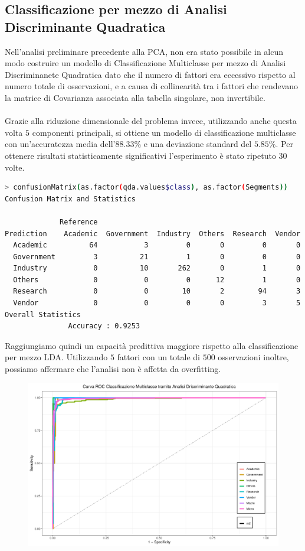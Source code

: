 \documentclass[11pt,a4paper]{article}
\begin{document}
\subsection{Classificazione per mezzo di Analisi Discriminante Quadratica}
Nell'analisi preliminare precedente alla PCA, non era stato possibile in alcun
modo costruire un modello di Classificazione Multiclasse per mezzo di Analisi
Discriminanete Quadratica dato che il numero di fattori era eccessivo rispetto
al numero totale di osservazioni, e a causa di collinearit\`a tra i fattori che
rendevano la matrice di Covarianza associata alla tabella singolare, non
invertibile.\\
\\
Grazie alla riduzione dimensionale del problema invece, utilizzando anche questa
volta $5$ componenti principali, si ottiene un modello di classificazione
multiclasse con un'accuratezza media dell'$88.33\%$ e una deviazione standard
del $5.85\%$. Per ottenere risultati statisticamente significativi l'esperimento
\`e stato ripetuto $30$ volte.
\begin{lstlisting}[language=bash,basicstyle=\scriptsize,tabsize=2,frame = single]
> confusionMatrix(as.factor(qda.values$class), as.factor(Segments))
Confusion Matrix and Statistics

             Reference
Prediction    Academic  Government  Industry  Others  Research  Vendor
  Academic          64           3         0       0         0       0
  Government         3          21         1       0         0       0
  Industry           0          10       262       0         1       0
  Others             0           0         0      12         1       0
  Research           0           0        10       2        94       3
  Vendor             0           0         0       0         3       5
Overall Statistics
               Accuracy : 0.9253
\end{lstlisting}
Raggiungiamo quindi un capacit\`a predittiva maggiore rispetto alla
classificazione per mezzo LDA. Utilizzando $5$ fattori con un totale di $500$
osservazioni inoltre, possiamo affermare che l'analisi non \`e affetta da
overfitting.
\clearpage
\begin{figure}[H]
	\vspace{-2.0cm}
	\includegraphics[scale=.55]{imgs/QDA_ggplot.pdf}
	\vspace{-0.4cm}
\end{figure}
\end{document}
